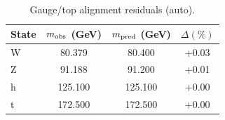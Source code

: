 \begin{table}[ht]
\centering
\begin{tabular}{lccc}
\toprule
State & $m_{\rm obs}$ (GeV) & $m_{\rm pred}$ (GeV) & $\Delta(\%)$ \\
\midrule
W & 80.379 & 80.400 & +0.03 \\
Z & 91.188 & 91.200 & +0.01 \\
h & 125.100 & 125.100 & +0.00 \\
t & 172.500 & 172.500 & +0.00 \\
\bottomrule
\end{tabular}
\caption{Gauge/top alignment residuals (auto).}
\label{tab:gauge-top-resids}
\end{table}
